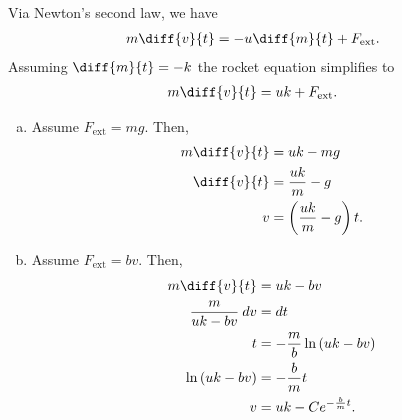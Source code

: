 \documentclass[10pt]{mypackage}
\begin{document}
\begin{solution}[38.7]
  Via Newton's second law, we have
  \begin{align*}
    m\diff{v}{t} &= -u \diff{m}{t} + F_{\text{ext}}.
  \end{align*}
  Assuming $\diff{m}{t} = -k$ the rocket equation simplifies to
  \begin{align*}
    m\diff{v}{t} &= uk + F_{\text{ext}}.
  \end{align*}
  \begin{enumerate}[(a)]
    \item Assume $F_{\text{ext}} = mg$. Then,
      \begin{align*}
        m\diff{v}{t} &= uk - mg\\
        \diff{v}{t} &= \frac{uk}{m} - g\\
        v &= \left( \frac{uk}{m} - g \right)t.
      \end{align*}
    \item Assume $F_{\text{ext}} = bv$. Then,
      \begin{align*}
        m\diff{v}{t} &= uk - bv\\
        \frac{m}{uk-bv}\:dv &= dt\\
        t &= -\frac{m}{b}\ln\left( uk-bv \right)\\
        \ln\left( uk-bv \right) &= -\frac{b}{m}t\\
        v &= uk - Ce^{-\frac{b}{m}t}.
      \end{align*}
      
  \end{enumerate}
\end{solution}
\end{document}
